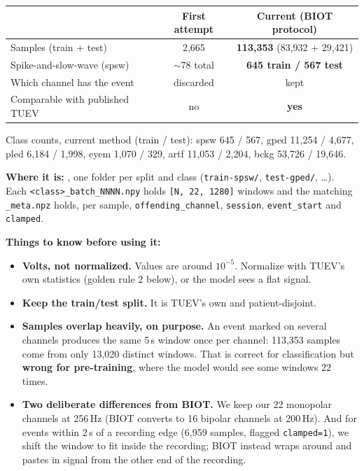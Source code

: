 \documentclass[11pt]{article}
\begin{document}
\begin{center}
\small
\begin{tabular}{@{}lcc@{}}
\toprule
 & First attempt & Current (BIOT protocol) \\
\midrule
Samples (train + test)          & 2,665          & \textbf{113,353} (83,932 + 29,421) \\
Spike-and-slow-wave (spsw)      & $\sim$78 total & \textbf{645 train / 567 test} \\
Which channel has the event     & discarded      & kept \\
Comparable with published TUEV  & no             & \textbf{yes} \\
\bottomrule
\end{tabular}
\end{center}

\medskip
\noindent Class counts, current method (train / test):
spsw 645 / 567, gped 11,254 / 4,677, pled 6,184 / 1,998, eyem 1,070 / 329,
artf 11,053 / 2,204, bckg 53,726 / 19,646.

\medskip
\noindent\textbf{Where it is:}
, one folder per split and
class (\texttt{train-spsw/}, \texttt{test-gped/}, \dots). Each
\texttt{<class>\_batch\_NNNN.npy} holds \texttt{[N, 22, 1280]} windows and the
matching \texttt{\_meta.npz} holds, per sample, \texttt{offending\_channel},
\texttt{session}, \texttt{event\_start} and \texttt{clamped}.

\medskip
\noindent\textbf{Things to know before using it:}
\begin{itemize}[nosep,leftmargin=1.4em]
  \item \textbf{Volts, not normalized.} Values are around $10^{-5}$. Normalize
  with TUEV's own statistics (golden rule 2 below), or the model sees a flat signal.
  \item \textbf{Keep the train/test split.} It is TUEV's own and patient-disjoint.
  \item \textbf{Samples overlap heavily, on purpose.} An event marked on several
  channels produces the same 5\,s window once per channel: 113,353 samples come
  from only 13,020 distinct windows. That is correct for classification but
  \textbf{wrong for pre-training}, where the model would see some windows 22 times.
  \item \textbf{Two deliberate differences from BIOT.} We keep our 22 monopolar
  channels at 256\,Hz (BIOT converts to 16 bipolar channels at 200\,Hz). And for
  events within 2\,s of a recording edge (6,959 samples, flagged
  \texttt{clamped=1}), we shift the window to fit inside the recording; BIOT
  instead wraps around and pastes in signal from the other end of the recording.
\end{itemize}
\end{document}
